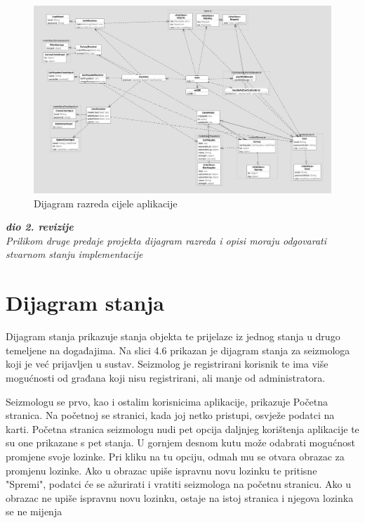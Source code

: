 			\begin{figure}[H]
				\includegraphics[width=\textwidth]{slike/classDiagram.png} 
				\caption{Dijagram razreda cijele aplikacije}
				\label{fig:uml} 
			\end{figure}

			\textbf{\textit{dio 2. revizije}}\\			
			
			\textit{Prilikom druge predaje projekta dijagram razreda i opisi moraju odgovarati stvarnom stanju implementacije}
			
			
			
			
			\eject
		
		\section{Dijagram stanja}

		Dijagram stanja prikazuje stanja objekta te prijelaze iz jednog stanja u drugo temeljene na događajima. Na slici 4.6 prikazan je dijagram stanja za seizmologa koji je već prijavljen u sustav. Seizmolog je registrirani korisnik te ima više mogućnosti od građana koji nisu registrirani, ali manje od administratora. 
        
		Seizmologu se prvo, kao i ostalim korisnicima aplikacije, prikazuje Početna stranica. Na početnoj se stranici, kada joj netko pristupi, osvježe podatci na karti. Početna stranica seizmologu nudi pet opcija daljnjeg korištenja aplikacije te su one prikazane s pet stanja. 
        U gornjem desnom kutu može odabrati mogućnost promjene svoje lozinke. Pri kliku na tu opciju, odmah mu se otvara obrazac za promjenu lozinke.
        Ako u obrazac upiše ispravnu novu lozinku te pritisne "Spremi", podatci će se ažurirati i vratiti seizmologa na početnu stranicu. Ako u obrazac ne upiše ispravnu novu lozinku, ostaje na istoj stranica i njegova lozinka se ne mijenja
        
